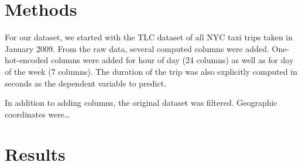 \documentclass{article}
\begin{document}







\section{Methods}

% 
% 
% 

For our dataset, we started with the TLC dataset of all NYC taxi trips taken in
January 2009. From the raw data, several computed columns were added.
One-hot-encoded columns were added for hour of day (24 columns) as well as for
day of the week (7 columns). The duration of the trip was also explicitly
computed in seconds as the dependent variable to predict.

In addition to adding columns, the original dataset was filtered. Geographic
coordinates were\ldots


\section{Results}
\end{document}
